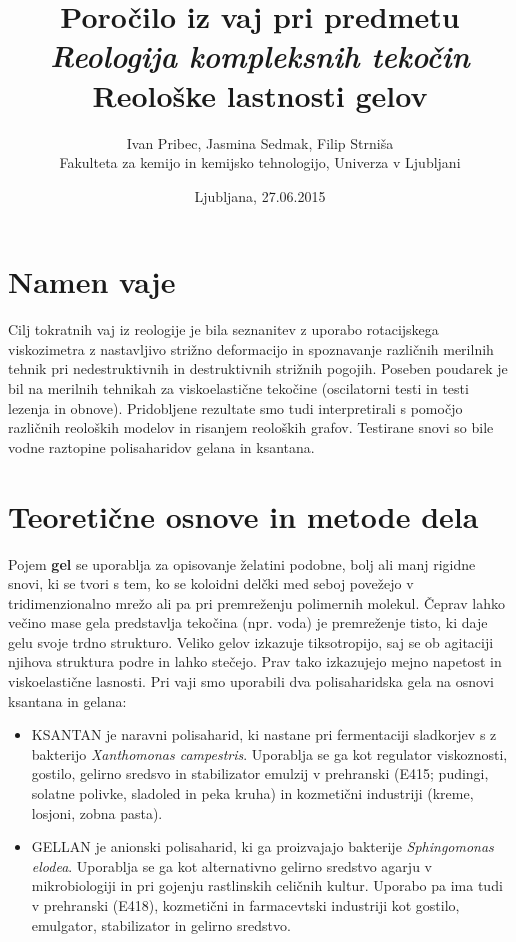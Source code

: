 \documentclass{article}
\begin{document}
\author{Ivan Pribec, Jasmina Sedmak, Filip Strniša\\
Fakulteta za kemijo in kemijsko tehnologijo, Univerza v Ljubljani}
\date{Ljubljana, 27.06.2015}
\title{Poročilo iz vaj pri predmetu \textit{Reologija kompleksnih tekočin}\\
Reološke lastnosti gelov}
\maketitle


\section{Namen vaje}
Cilj tokratnih vaj iz reologije je bila seznanitev z uporabo rotacijskega viskozimetra z nastavljivo strižno deformacijo in spoznavanje različnih merilnih tehnik pri nedestruktivnih in destruktivnih strižnih pogojih. Poseben poudarek je bil na merilnih tehnikah za viskoelastične tekočine (oscilatorni testi in testi lezenja in obnove). Pridobljene rezultate smo tudi interpretirali s pomočjo različnih reoloških modelov in risanjem reoloških grafov. Testirane snovi so bile vodne raztopine polisaharidov gelana in ksantana.

\section{Teoretične osnove in metode dela}

Pojem \textbf{gel} se uporablja za opisovanje želatini podobne, bolj ali manj rigidne snovi, ki se tvori s tem, ko se koloidni delčki med seboj povežejo v tridimenzionalno mrežo ali pa pri premreženju polimernih molekul. Čeprav lahko večino mase gela predstavlja tekočina (npr. voda) je premreženje tisto, ki daje gelu svoje trdno strukturo. Veliko gelov izkazuje tiksotropijo, saj se ob agitaciji njihova struktura podre in lahko stečejo. Prav tako izkazujejo mejno napetost in viskoelastične lasnosti. Pri vaji smo uporabili dva polisaharidska gela na osnovi ksantana in gelana:
\begin{itemize}
\item KSANTAN je naravni polisaharid, ki nastane pri fermentaciji sladkorjev s z bakterijo \textit{Xanthomonas campestris}. Uporablja se ga kot regulator viskoznosti, gostilo, gelirno sredsvo in stabilizator emulzij v prehranski (E415; pudingi, solatne polivke, sladoled in peka kruha) in kozmetični industriji (kreme, losjoni, zobna pasta).
 \item GELLAN je anionski polisaharid, ki ga proizvajajo bakterije \textit{Sphingomonas elodea}. Uporablja se ga kot alternativno gelirno sredstvo agarju v mikrobiologiji in pri gojenju rastlinskih celičnih kultur. Uporabo pa ima tudi v prehranski (E418), kozmetični in farmacevtski industriji kot gostilo, emulgator, stabilizator in gelirno sredstvo.
\end{itemize}
\end{document}
